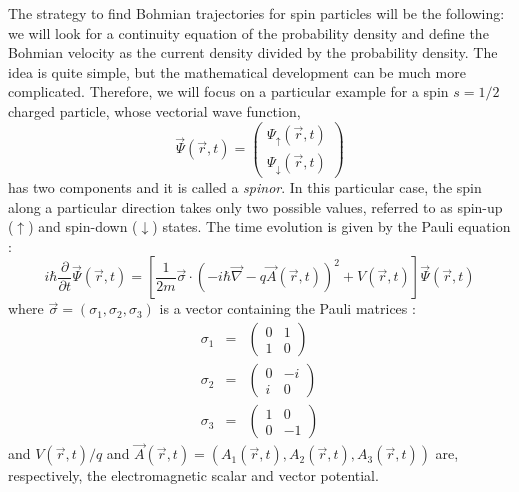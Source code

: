 \documentclass[nofootinbib, secnumarabic, amsmath, nobibnotes,10pt,aps,pra]{revtex4-1}
\begin{document}
The strategy to find Bohmian trajectories for spin particles will be the following: we will look for a continuity equation of the probability density and define the Bohmian velocity as the current density divided by the probability density.
The idea is quite simple, but the mathematical development can be much more complicated. Therefore, we will focus on a particular example for a spin $s = 1/2$ charged particle, whose vectorial wave function,
\begin{equation}
\vec \Psi(\vec r,t) = \left(
\begin{array}{c}
\Psi_{\uparrow}(\vec r,t) \\ \Psi_{\downarrow}(\vec r,t)
\end{array}
\right)
\end{equation}
has two components and it is called a \textit{spinor}. In this particular case, the spin along a particular direction takes only two possible values, referred to as spin-up ($\uparrow$) and spin-down ($\downarrow$) states.
The time evolution is given by the Pauli equation \cite{om.ward}:
\begin{equation}
\label{om.pauli}
i \hbar \frac{ \partial}{\partial t} \vec \Psi(\vec r,t) =
\left[ \frac{1}{2m} \vec{\sigma} \cdot \left(- i \hbar \vec{\nabla} - q \vec{A} (\vec r,t) \right) ^2 + V(\vec r,t) \right]
\vec \Psi(\vec r,t)
\end{equation}
where $\vec{\sigma} = (\sigma_1, \sigma_2, \sigma_3)$ is a vector containing the Pauli matrices \cite{om.landaulif}:
\begin{eqnarray}
\sigma_1 & = & \begin{pmatrix} 0&1 \\ 1&0 \end{pmatrix}  \\
\sigma_2 & = & \begin{pmatrix} 0&-i \\ i&0 \end{pmatrix} \\
\sigma_3 & = & \begin{pmatrix} 1&0 \\ 0&-1 \end{pmatrix}
\end{eqnarray}
and $V(\vec r,t)/q$ and $\vec{A}(\vec r,t) = (A_1(\vec r,t),A_2(\vec r,t),A_3(\vec r,t))$ are, respectively, the electromagnetic scalar and vector potential.
\end{document}

